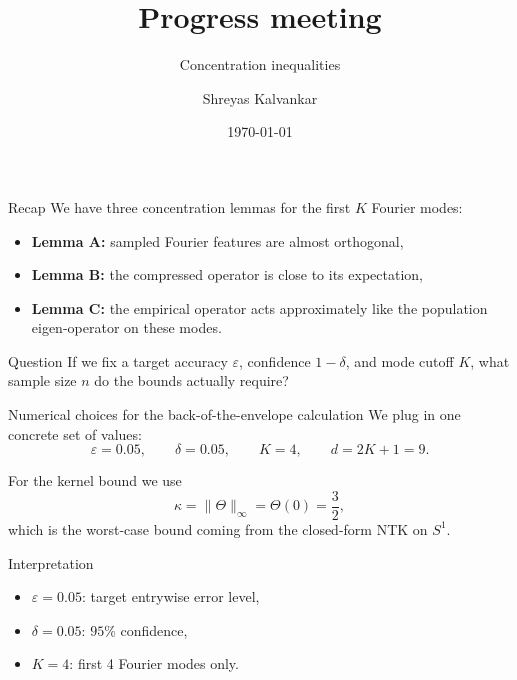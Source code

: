 \documentclass[10pt,aspectratio=169]{beamer}
\title{Progress meeting}
\subtitle{Concentration inequalities}
\author{Shreyas Kalvankar}
\institute{TU Delft}
\date{\today}
\begin{document}
\maketitle
\begin{frame}{Recap}
	\small
	We have three concentration lemmas for the first \(K\) Fourier modes:
	\begin{itemize}
		\item \textbf{Lemma A:} sampled Fourier features are almost orthogonal,
		\item \textbf{Lemma B:} the compressed operator is close to its expectation,
		\item \textbf{Lemma C:} the empirical operator acts approximately like the population eigen-operator on these modes.
	\end{itemize}

	\begin{block}{Question}
		If we fix a target accuracy \(\varepsilon\), confidence \(1-\delta\), and mode cutoff \(K\), what sample size \(n\) do the bounds actually require?
	\end{block}

\end{frame}

\begin{frame}{Numerical choices for the back-of-the-envelope calculation}
	\small
	We plug in one concrete set of values:
	\[
		\varepsilon = 0.05,\qquad \delta = 0.05,\qquad K=4,\qquad d=2K+1=9.
	\]

	For the kernel bound we use
	\[
		\kappa=\|\Theta\|_\infty=\Theta(0)=\frac{3}{2},
	\]
	which is the worst-case bound coming from the closed-form NTK on \(S^1\).

	\begin{block}{Interpretation}
		\begin{itemize}
			\item \(\varepsilon=0.05\): target entrywise error level,
			\item \(\delta=0.05\): \(95\%\) confidence,
			\item \(K=4\): first 4 Fourier modes only.
		\end{itemize}
	\end{block}

\end{frame}
\end{document}
